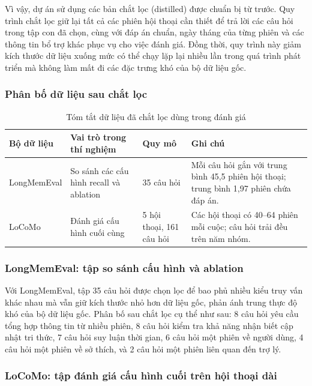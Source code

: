 \documentclass[../main.tex]{subfiles}
\begin{document}
Vì vậy, dự án sử dụng các bản chắt lọc (distilled) được chuẩn bị từ trước. Quy trình chắt lọc giữ lại tất cả các phiên hội thoại cần thiết để trả lời các câu hỏi trong tập con đã chọn, cùng với đáp án chuẩn, ngày tháng của từng phiên và các thông tin bổ trợ khác phục vụ cho việc đánh giá. Đồng thời, quy trình này giảm kích thước dữ liệu xuống mức có thể chạy lặp lại nhiều lần trong quá trình phát triển mà không làm mất đi các đặc trưng khó của bộ dữ liệu gốc.

\subsubsection{Phân bố dữ liệu sau chắt lọc}

\begin{table}[H]
\centering
\caption{Tóm tắt dữ liệu đã chắt lọc dùng trong đánh giá}
\label{tab:distilled_dataset_summary}
\small
\begin{tabularx}{\linewidth}{@{}p{3.0cm}Yp{2.4cm}Y@{}}
\toprule
\textbf{Bộ dữ liệu} & \textbf{Vai trò trong thí nghiệm} & \textbf{Quy mô} & \textbf{Ghi chú} \\
\midrule
LongMemEval & So sánh các cấu hình recall và ablation & 35 câu hỏi & Mỗi câu hỏi gắn với trung bình 45,5 phiên hội thoại; trung bình 1,97 phiên chứa đáp án. \\
LoCoMo & Đánh giá cấu hình cuối cùng & 5 hội thoại, 161 câu hỏi & Các hội thoại có 40--64 phiên mỗi cuộc; câu hỏi trải đều trên năm nhóm. \\
\bottomrule
\end{tabularx}
\end{table}

\subsubsection{LongMemEval: tập so sánh cấu hình và ablation}

Với LongMemEval, tập 35 câu hỏi được chọn lọc để bao phủ nhiều kiểu truy vấn khác nhau mà vẫn giữ kích thước nhỏ hơn dữ liệu gốc, phản ánh trung thực độ khó của bộ dữ liệu gốc. Phân bố sau chắt lọc cụ thể như sau: 8 câu hỏi yêu cầu tổng hợp thông tin từ nhiều phiên, 8 câu hỏi kiểm tra khả năng nhận biết cập nhật tri thức, 7 câu hỏi suy luận thời gian, 6 câu hỏi một phiên về người dùng, 4 câu hỏi một phiên về sở thích, và 2 câu hỏi một phiên liên quan đến trợ lý. 

\subsubsection{LoCoMo: tập đánh giá cấu hình cuối trên hội thoại dài}
\end{document}
